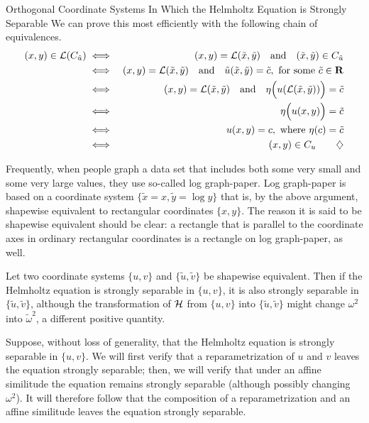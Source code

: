 \begin{section}{Orthogonal Coordinate Systems In Which the Helmholtz Equation is Strongly Separable}
\proof
We can prove this most efficiently with the following chain of equivalences.
\begin{eqnarray*}
(x,y) \in \mathcal{L}(C_{\tilde{u}}) & \iff & (x,y) = \mathcal{L}(\tilde{x},\tilde{y})
\quad \mbox{and} \quad
(\tilde{x},\tilde{y}) \in C_{\tilde{u}} \\
 & \iff & (x,y) = \mathcal{L}(\tilde{x},\tilde{y})
\quad \mbox{and} \quad
\tilde{u}(\tilde{x},\tilde{y}) = \tilde{c}, \mbox{ for some $\tilde{c} \in \mathbf{R}$} \\
 & \iff & (x,y) = \mathcal{L}(\tilde{x},\tilde{y})
\quad \mbox{and} \quad
\eta\Big(u(\mathcal{L}(\tilde{x},\tilde{y}))\Big) = \tilde{c} \\
 & \iff & \eta\Big(u(x,y)\Big) = \tilde{c} \\
 & \iff & u(x,y) = c, \mbox{ where $\eta(c) = \tilde{c}$} \\
 & \iff & (x,y) \in C_u \qquad \diamondsuit
\end{eqnarray*}

Frequently, when people graph a data set that includes both some very small and some very large values, they use so-called log graph-paper.  Log graph-paper is based on a coordinate system $\{ \tilde{x} = x, \tilde{y} = \log y \}$ that is, by the above argument, shapewise equivalent to rectangular coordinates $\{ x,y \}$.  The reason it is said to be shapewise equivalent should be clear: a rectangle that is parallel to the coordinate axes in ordinary rectangular coordinates is a rectangle on log graph-paper, as well.

\begin{theorem}
\label{shaprestrong}
Let two coordinate systems $\{ u,v \}$ and $\{ \tilde{u},\tilde{v} \}$ be shapewise equivalent.  Then if the Helmholtz equation is strongly separable in $\{ u,v \}$, it is also strongly separable in $\{ \tilde{u}, \tilde{v} \}$, although the transformation of $\mathcal{H}$ from $\{ u,v \}$ into $\{ \tilde{u}, \tilde{v} \}$ might change $\omega^2$ into $\widetilde{\omega}^2$, a different positive quantity.
\end{theorem}

\proof
Suppose, without loss of generality, that the Helmholtz equation is strongly separable in $\{ u,v \}$.  We will first verify that a reparametrization of $u$ and $v$ leaves the equation strongly separable; then, we will verify that under an affine similitude the equation remains strongly separable (although possibly changing $\omega^2$).  It will therefore follow that the composition of a reparametrization and an affine similitude leaves the equation strongly separable.


\end{section}
